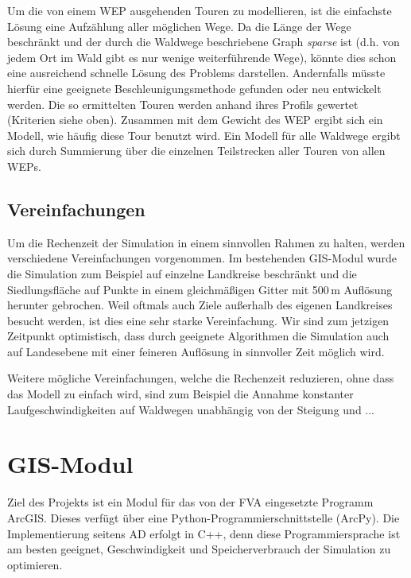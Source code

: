 \documentclass[parskip=half,german]{scrartcl}
\begin{document}
Um die von einem WEP ausgehenden Touren zu modellieren, ist die einfachste
Lösung eine Aufzählung aller möglichen Wege. Da die Länge der Wege beschränkt
und der durch die Waldwege beschriebene Graph \emph{sparse} ist (d.h. von jedem
Ort im Wald gibt es nur wenige weiterführende Wege), könnte dies schon eine
ausreichend schnelle Lösung des Problems darstellen. Andernfalls müsste hierfür
eine geeignete Beschleunigungsmethode gefunden oder neu entwickelt werden. 
Die so ermittelten Touren werden anhand ihres Profils gewertet (Kriterien
siehe oben). Zusammen mit dem Gewicht des WEP ergibt sich ein Modell, wie häufig
diese Tour benutzt wird. Ein Modell für alle Waldwege ergibt sich durch
Summierung über die einzelnen Teilstrecken aller Touren von allen WEPs.

\subsection*{Vereinfachungen}
Um die Rechenzeit der Simulation in einem sinnvollen Rahmen zu halten, werden
verschiedene Vereinfachungen vorgenommen. Im bestehenden GIS-Modul wurde die
Simulation zum Beispiel auf einzelne Landkreise beschränkt und die
Siedlungsfläche auf Punkte in einem gleichmäßigen Gitter mit 500\,m Auflösung
herunter gebrochen. Weil oftmals auch Ziele außerhalb des eigenen Landkreises
besucht werden, ist dies eine sehr starke Vereinfachung. Wir sind zum jetzigen
Zeitpunkt optimistisch, dass durch geeignete Algorithmen die Simulation auch auf
Landesebene mit einer feineren Auflösung in sinnvoller Zeit möglich wird. 

Weitere mögliche Vereinfachungen, welche die Rechenzeit reduzieren, ohne dass
das Modell zu einfach wird, sind zum Beispiel die Annahme konstanter
Laufgeschwindigkeiten auf Waldwegen unabhängig von der Steigung und ...

    
  
\section{GIS-Modul}
Ziel des Projekts ist ein Modul für das von der FVA eingesetzte Programm ArcGIS.
Dieses verfügt über eine Python-Programmierschnittstelle (ArcPy). Die
Implementierung seitens AD erfolgt in C++, denn diese Programmiersprache ist am
besten geeignet, Geschwindigkeit und Speicherverbrauch der Simulation zu
optimieren. 
\end{document}
